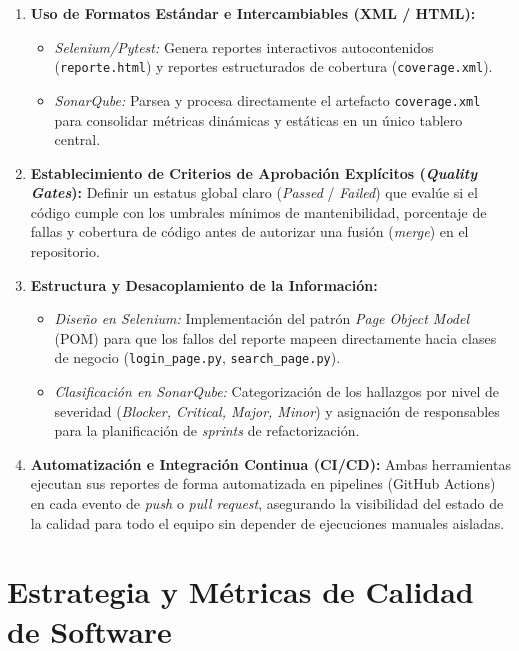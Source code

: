 \documentclass[12pt, letterpaper]{article}
\begin{document}
\begin{enumerate}[leftmargin=*]
    \item \textbf{Uso de Formatos Estándar e Intercambiables (XML / HTML):}
    \begin{itemize}
        \item \textit{Selenium/Pytest:} Genera reportes interactivos autocontenidos (\texttt{reporte.html}) y reportes estructurados de cobertura (\texttt{coverage.xml}).
        \item \textit{SonarQube:} Parsea y procesa directamente el artefacto \texttt{coverage.xml} para consolidar métricas dinámicas y estáticas en un único tablero central.
    \end{itemize}
    \item \textbf{Establecimiento de Criterios de Aprobación Explícitos (\textit{Quality Gates}):}
    Definir un estatus global claro (\textit{Passed} / \textit{Failed}) que evalúe si el código cumple con los umbrales mínimos de mantenibilidad, porcentaje de fallas y cobertura de código antes de autorizar una fusión (\textit{merge}) en el repositorio.
    \item \textbf{Estructura y Desacoplamiento de la Información:}
    \begin{itemize}
        \item \textit{Diseño en Selenium:} Implementación del patrón \textit{Page Object Model} (POM) para que los fallos del reporte mapeen directamente hacia clases de negocio (\texttt{login\_page.py}, \texttt{search\_page.py}).
        \item \textit{Clasificación en SonarQube:} Categorización de los hallazgos por nivel de severidad (\textit{Blocker, Critical, Major, Minor}) y asignación de responsables para la planificación de \textit{sprints} de refactorización.
    \end{itemize}
    \item \textbf{Automatización e Integración Continua (CI/CD):}
    Ambas herramientas ejecutan sus reportes de forma automatizada en pipelines (GitHub Actions) en cada evento de \textit{push} o \textit{pull request}, asegurando la visibilidad del estado de la calidad para todo el equipo sin depender de ejecuciones manuales aisladas.
\end{enumerate}

\section{Estrategia y Métricas de Calidad de Software}
\end{document}
